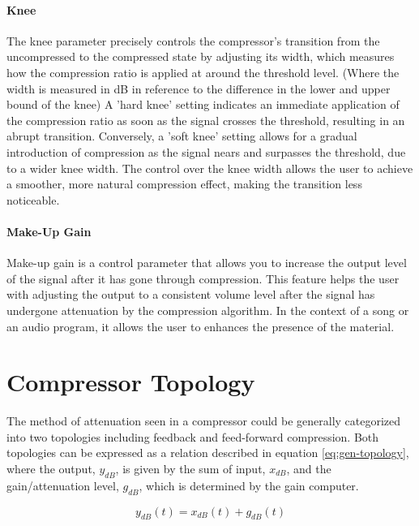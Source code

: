 \documentclass[10pt]{article}
\begin{document}
\begin{multicols*}{2}
            \paragraph{Knee}
                The knee parameter precisely controls the compressor's transition from the uncompressed to the compressed state by adjusting its width, which measures how the compression ratio is applied at around the threshold level. (Where the width is measured in dB in reference to the difference in the lower and upper bound of the knee) A 'hard knee' setting indicates an immediate application of the compression ratio as soon as the signal crosses the threshold, resulting in an abrupt transition. Conversely, a 'soft knee' setting allows for a gradual introduction of compression as the signal nears and surpasses the threshold, due to a wider knee width. The control over the knee width allows the user to achieve a smoother, more natural compression effect, making the transition less noticeable.
            
            \paragraph{Make-Up Gain}
                Make-up gain is a control parameter that allows you to increase the output level of the signal after it has gone through compression. This feature helps the user with adjusting the output to a consistent volume level after the signal has undergone attenuation by the compression algorithm. In the context of a song or an audio program, it allows the user to enhances the presence of the material.

        \section{Compressor Topology} \label{sec:comp-tpgy}
            The method of attenuation seen in a compressor could be generally categorized into two topologies including feedback and feed-forward compression. Both topologies can be expressed as a relation described in equation \ref{eq:gen-topology}, where the output, $y_{dB}$, is given by the sum of input, $x_{dB}$, and the gain/attenuation level, $g_{dB}$, which is determined by the gain computer. 

                \begin{equation} \label{eq:gen-topology}
                    y_{dB}(t)=x_{dB}(t)+g_{dB}(t)
                \end{equation}
            

\end{multicols*}
\end{document}
